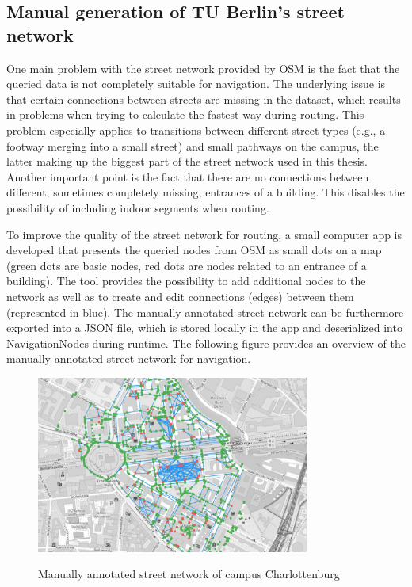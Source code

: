 \subsection{Manual generation of TU Berlin's street network} \label{sub_sec:street_network_generation}
One main problem with the street network provided by OSM is the fact that the queried data is not completely suitable for navigation. The underlying issue is that certain connections between streets are missing in the dataset, which results in problems when trying to calculate the fastest way during routing. This problem especially applies to transitions between different street types (e.g., a footway merging into a small street) and small pathways on the campus, the latter making up the biggest part of the street network used in this thesis. Another important point is the fact that there are no connections between different, sometimes completely missing, entrances of a building. This disables the possibility of including indoor segments when routing.

To improve the quality of the street network for routing, a small computer app is developed that presents the queried nodes from OSM as small dots on a map (green dots are basic nodes, red dots are nodes related to an entrance of a building). The tool provides the possibility to add additional nodes to the network as well as to create and edit connections (edges) between them (represented in blue). The manually annotated street network can be furthermore exported into a JSON file, which is stored locally in the app and deserialized into NavigationNodes during runtime. The following figure provides an overview of the manually annotated street network for navigation.

\begin{figure}[H]
	\centering
	\includegraphics[width=0.8\textwidth]{images/street_network_for_navigation.jpeg}\\
	\caption{Manually annotated street network of campus Charlottenburg}
\end{figure}

